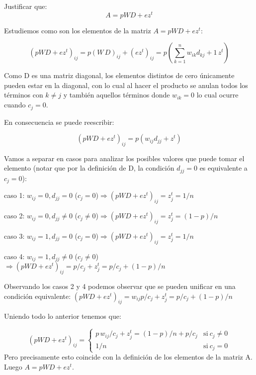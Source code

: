 
Justificar que:
\begin{displaymath}
A = p WD + ez^{t}
\end{displaymath}

Estudiemos como son los elementos de la matriz $A = p WD + ez^{t}$:

\begin{displaymath}
(p WD + ez^{t})_{ij} = p(W\,D)_{ij}+(ez^{t})_{ij} = p(\sum_{k=1}^{n}w_{ik}d_{kj}+1\,z^{t})
\end{displaymath}

Como D es una matriz diagonal, los elementos distintos de cero únicamente pueden estar en la diagonal, con lo cual al hacer el producto se anulan todos los términos con $k\not=j$ y también aquellos términos donde $w_{ik}=0$ lo cual ocurre cuando $c_j=0$.

En consecuencia se puede reescribir:

\begin{displaymath}
(p WD + ez^{t})_{ij} = p(w_{ij}d_{jj}+z^{t})
\end{displaymath}

Vamos a separar en casos para analizar los posibles valores que puede tomar el elemento (notar que por la definición de D, la condición $d_{jj}=0$ es equivalente a $c_j=0$):

caso 1: $w_{ij}=0, d_{jj}=0$ ($c_j=0$)$\Rightarrow(p WD + ez^{t})_{ij} =z_j^t=1/n$


caso 2: $w_{ij}=0, d_{jj}\not=0$ ($c_j\not=0$)$\Rightarrow(p WD + ez^{t})_{ij} =z_j^t=(1-p)/n$


caso 3: $w_{ij}=1, d_{jj}=0$ ($c_j=0$)$\Rightarrow(p WD + ez^{t})_{ij} =z_j^t=1/n$


caso 4: $w_{ij}=1, d_{jj}\not=0$ ($c_j\not=0$)$\Rightarrow(p WD + ez^{t})_{ij} =p/c_j+z_j^t=p/c_j+(1-p)/n$

Observando los casos 2 y 4 podemos observar que se pueden  unificar en una condición equivalente: $(p WD + ez^{t})_{ij} =w_{ij}p/c_j+z_j^t=p/c_j+(1-p)/n$

Uniendo todo lo anterior tenemos que:


\begin{equation}
 (p WD + ez^{t})_{ij} = \left\{
    \begin{array}{ll}
	 p\,w_{ij}/c_j+z_j^t=(1-p)/n+p/c_j & \mathrm{si\ } c_j \not= 0 \\
	 1/n & \mathrm{si\ } c_j=0
	 \end{array}
   \right.
\end{equation}
Pero precisamente esto coincide con la definición de los elementos de la matriz A. Luego $A = p WD + ez^{t}$.

